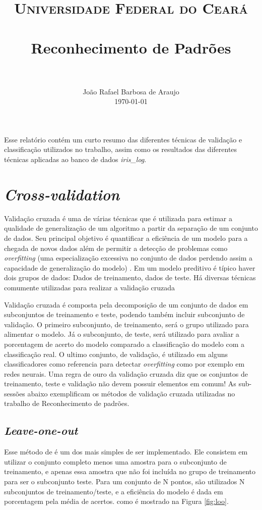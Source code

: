 \documentclass[paper=a4, fontsize=11pt]{scrartcl}
\title{
		\usefont{OT1}{bch}{b}{n}
		\normalfont \normalsize \textsc{Universidade Federal do Ceará} \\ [25pt]
		\horrule{0.5pt} \\[0.4cm]
		\huge Reconhecimento de Padrões \\
		\horrule{2pt} \\[0.5cm]
}
\author{
		\normalfont 								\normalsize
        João Rafael Barbosa de Araujo\\[-3pt]		\normalsize
        \today
}
\date{}
\numberwithin{equation}{section}		%
\numberwithin{figure}{section}			%
\numberwithin{table}{section}				%
\begin{document}
\maketitle

Esse relatório contém um curto resumo das diferentes técnicas de validação e classificação utilizados no trabalho, assim como os resultados das diferentes técnicas aplicadas ao banco de dados \textit{iris\_log}.

\section{\textit{Cross-validation}}

Validação cruzada é uma de várias técnicas que é utilizada para estimar a qualidade de generalização de um algoritmo a partir da separação de um conjunto de dados. Seu principal objetivo é quantificar a eficiência de um modelo para a chegada de novos dados além de permitir a detecção de problemas como \textit{overfitting} (uma especialização excessiva no conjunto de dados perdendo assim a capacidade de generalização do modelo) . Em um modelo preditivo é típico haver dois grupos de dados: Dados de treinamento, dados de teste. Há diversas técnicas comumente utilizadas para realizar a validação cruzada

Validação cruzada é composta pela decomposição de um conjunto de dados em subconjuntos de treinamento e teste, podendo também incluir subconjunto de validação. O primeiro subconjunto, de treinamento, será o grupo utilizado para alimentar o modelo. Já o subconjunto, de teste, será utilizado para avaliar a porcentagem de acerto do modelo comparado a classificação do modelo com a classificação real. O ultimo conjunto, de validação, é utilizado em alguns classificadores como referencia para detectar \textit{overfitting} como por exemplo em redes neurais. Uma regra de ouro da validação cruzada diz que os conjuntos de treinamento, teste e validação não devem possuir elementos em comum! As sub-sessões abaixo exemplificam os métodos de validação cruzada utilizadas no trabalho de Reconhecimento de padrões.

\subsection{\textit{Leave-one-out}}
Esse método de é um dos mais simples de ser implementado. Ele consistem em utilizar o conjunto completo menos uma amostra para o subconjunto de treinamento, e apenas essa amostra que não foi incluída no grupo de treinamento para ser o subconjunto teste. Para um conjunto de N pontos, são utilizados N subconjuntos de treinamento/teste, e a eficiência do modelo é dada em porcentagem pela média de acertos. como é mostrado na Figura \ref{fig:loo}.
\end{document}
